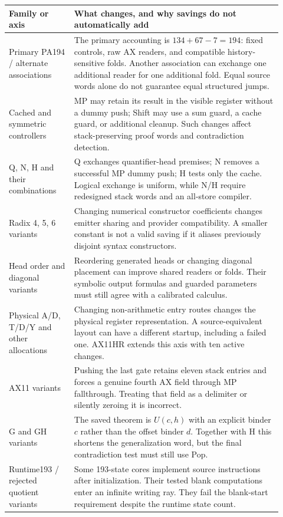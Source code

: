 \documentclass[11pt,letterpaper]{article}
\begin{document}
\begin{longtable}{@{}p{0.22\linewidth}p{0.70\linewidth}@{}}
\toprule
Family or axis & What changes, and why savings do not automatically add\\
\midrule\endhead
Primary PA194 / alternate associations &
The primary accounting is $134+67-7=194$: fixed controls, raw AX readers,
and compatible history-sensitive folds. Another association can exchange
one additional reader for one additional fold. Equal source words alone
do not guarantee equal structured jumps.\\[4pt]
Cached and symmetric controllers &
MP may retain its result in the visible register without a dummy push;
Shift may use a sum guard, a cache guard, or additional cleanup. Such
changes affect stack-preserving proof words and contradiction detection.\\[4pt]
Q, N, H and their combinations &
Q exchanges quantifier-head premises; N removes a successful MP dummy
push; H tests only the cache. Logical exchange is uniform, while N/H
require redesigned stack words and an all-store compiler.\\[4pt]
Radix 4, 5, 6 variants &
Changing numerical constructor coefficients changes emitter sharing and
provider compatibility. A smaller constant is not a valid saving if it
aliases previously disjoint syntax constructors.\\[4pt]
Head order and diagonal variants &
Reordering generated heads or changing diagonal placement can improve
shared readers or folds. Their symbolic output formulas and guarded
parameters must still agree with a calibrated calculus.\\[4pt]
Physical A/D, T/D/Y and other allocations &
Changing non-arithmetic entry routes changes the physical register
representation. A source-equivalent layout can have a different startup,
including a failed one. AX11HR extends this axis with ten active changes.\\[4pt]
AX11 variants &
Pushing the last gate retains eleven stack entries and forces a genuine
fourth AX field through MP fallthrough. Treating that field as a delimiter
or silently zeroing it is incorrect.\\[4pt]
G and GH variants &
The saved theorem is $U(c,h)$ with an explicit binder $c$ rather than the
offset binder $d$. Together with H this shortens the generalization word,
but the final contradiction test must still use Pop.\\[4pt]
Runtime193 / rejected quotient variants &
Some 193-state cores implement source instructions after initialization.
Their tested blank computations enter an infinite writing ray. They fail
the blank-start requirement despite the runtime state count.\\
\bottomrule
\end{longtable}
\end{document}
